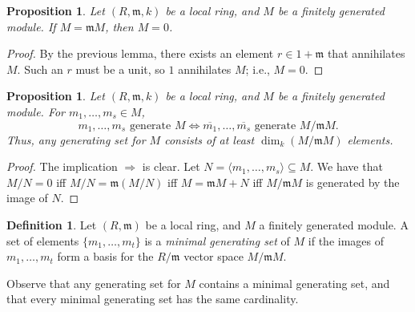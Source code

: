 \documentclass{amsart}[12pt]
\newcommand{\ZZ}{\mathbb{Z}}
\newcommand{\NN}{\mathbb{N}}
\newcommand{\m}{{\mathfrak m}}
\numberwithin{equation}{section}
\theoremstyle{plain} %
\newtheorem{proposition}[equation]{Proposition}
\theoremstyle{definition}
\newtheorem{definition}[equation]{Definition}
\theoremstyle{remark}
\begin{document}
\begin{proposition}
	Let $(R,\m,k)$ be a local ring, and $M$ be a finitely generated module. If $M=\m M$, then $M=0$.
\end{proposition}
\begin{proof}
	By the previous lemma, there exists an element $r\in 1+\m$ that annihilates $M$. Such an $r$ must be a unit, so $1$ annihilates $M$; i.e., $M=0$.
\end{proof}

\begin{proposition}
	Let $(R,\m,k)$ be a local ring, and $M$ be a finitely generated module. For $m_1,\dots,m_s\in M$,
	\[ m_1,\dots, m_s \text{ generate } M \Longleftrightarrow \overline{m_1},\dots,\overline{m_s} \text{ generate } M/\m M.\] Thus, any generating set for $M$ consists of at least $\dim_k (M/\m M)$ elements.
\end{proposition}
\begin{proof} The implication $\Rightarrow$ is clear.
	Let $N=\langle m_1,\dots, m_s \rangle \subseteq M$. We have that $M/N=0$ iff $M/N= \m(M/N)$ iff $M= \m M + N$ iff $M/\m M$ is generated by the image of $N$.
\end{proof}

\begin{definition}
	Let $(R,\m)$ be a local ring, and $M$ a finitely generated module. A set of elements $\{m_1,\dots,m_t\}$ is a \emph{minimal generating set} of $M$ if the images of $m_1,\dots,m_t$ form a basis for the $R/\m$ vector space $M/\m M$.
\end{definition}

Observe that any generating set for $M$ contains a minimal generating set, and that every minimal generating set has the same cardinality.



	
\end{document}
